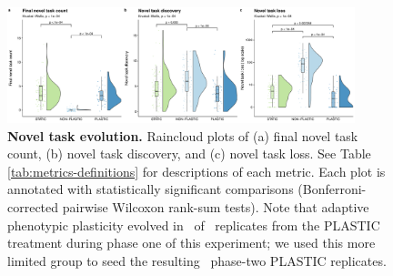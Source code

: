 \begin{figure}[h!]
    \centering
    \includegraphics[width=0.9\textwidth]{media-complex-traits-magnitude-panel.pdf}
    \caption{\small
    \textbf{Novel task evolution.}
    Raincloud plots of
    (a) final novel task count,
    (b) novel task discovery,
    and (c) novel task loss.
    See Table \ref{tab:metrics-definitions} for descriptions of each metric.
    Each plot is annotated with statistically significant comparisons (Bonferroni-corrected pairwise Wilcoxon rank-sum tests).
    Note that adaptive phenotypic plasticity evolved in \novelTraitsPlasticReps\ of \novelTraitsReplicates\ replicates from the PLASTIC treatment during phase one of this experiment; we used this more limited group to seed the resulting \novelTraitsPlasticReps\ phase-two PLASTIC replicates.
    }
    \label{fig:complex-traits-magnitude}
\end{figure}